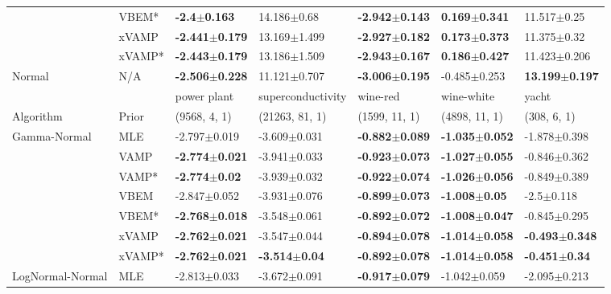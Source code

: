 \begin{tabular}{lllllll}
       & VBEM* &    \textbf{-2.4$\pm$0.163} &            14.186$\pm$0.68 &  \textbf{-2.942$\pm$0.143} &  \textbf{0.169$\pm$0.341} &            11.517$\pm$0.25 \\
       & xVAMP &  \textbf{-2.441$\pm$0.179} &           13.169$\pm$1.499 &  \textbf{-2.927$\pm$0.182} &  \textbf{0.173$\pm$0.373} &            11.375$\pm$0.32 \\
       & xVAMP* &  \textbf{-2.443$\pm$0.179} &           13.186$\pm$1.509 &  \textbf{-2.943$\pm$0.167} &  \textbf{0.186$\pm$0.427} &           11.423$\pm$0.206 \\
Normal & N/A &  \textbf{-2.506$\pm$0.228} &           11.121$\pm$0.707 &  \textbf{-3.006$\pm$0.195} &          -0.485$\pm$0.253 &  \textbf{13.199$\pm$0.197} \\
\midrule
       &     &                power plant &          superconductivity &                   wine-red &                 wine-white &                      yacht \\
Algorithm & Prior& (9568, 4, 1)& (21263, 81, 1)& (1599, 11, 1)& (4898, 11, 1)& (308, 6, 1)\\
\midrule
Gamma-Normal & MLE &           -2.797$\pm$0.019 &           -3.609$\pm$0.031 &  \textbf{-0.882$\pm$0.089} &  \textbf{-1.035$\pm$0.052} &           -1.878$\pm$0.398 \\
       & VAMP &  \textbf{-2.774$\pm$0.021} &           -3.941$\pm$0.033 &  \textbf{-0.923$\pm$0.073} &  \textbf{-1.027$\pm$0.055} &           -0.846$\pm$0.362 \\
       & VAMP* &   \textbf{-2.774$\pm$0.02} &           -3.939$\pm$0.032 &  \textbf{-0.922$\pm$0.074} &  \textbf{-1.026$\pm$0.056} &           -0.849$\pm$0.389 \\
       & VBEM &           -2.847$\pm$0.052 &           -3.931$\pm$0.076 &  \textbf{-0.899$\pm$0.073} &   \textbf{-1.008$\pm$0.05} &             -2.5$\pm$0.118 \\
       & VBEM* &  \textbf{-2.768$\pm$0.018} &           -3.548$\pm$0.061 &  \textbf{-0.892$\pm$0.072} &  \textbf{-1.008$\pm$0.047} &           -0.845$\pm$0.295 \\
       & xVAMP &  \textbf{-2.762$\pm$0.021} &           -3.547$\pm$0.044 &  \textbf{-0.894$\pm$0.078} &  \textbf{-1.014$\pm$0.058} &  \textbf{-0.493$\pm$0.348} \\
       & xVAMP* &  \textbf{-2.762$\pm$0.021} &   \textbf{-3.514$\pm$0.04} &  \textbf{-0.892$\pm$0.078} &  \textbf{-1.014$\pm$0.058} &   \textbf{-0.451$\pm$0.34} \\
LogNormal-Normal & MLE &           -2.813$\pm$0.033 &           -3.672$\pm$0.091 &  \textbf{-0.917$\pm$0.079} &           -1.042$\pm$0.059 &           -2.095$\pm$0.213 \\

\end{tabular}
